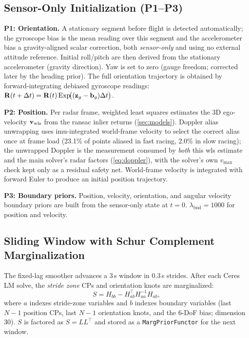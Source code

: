 \subsection{Sensor-Only Initialization (P1--P3)}
\label{sec:init}

\textbf{P1: Orientation.}
A stationary segment before flight is detected automatically; the gyroscope
bias is the mean reading over this segment and the accelerometer bias a
gravity-aligned scalar correction, both \emph{sensor-only} and using no
external attitude reference.
Initial roll/pitch are then derived from the stationary accelerometer
(gravity direction).  Yaw is set to zero (gauge freedom; corrected
later by the heading prior).  The full orientation trajectory is
obtained by forward-integrating debiased gyroscope readings:
$\mathbf{R}(t+\Delta t) = \mathbf{R}(t)\,\mathrm{Exp}\!\bigl((\mathbf{z}_g - \mathbf{b}_g)\Delta t\bigr)$.

\textbf{P2: Position.}
Per radar frame, weighted least squares estimates the 3D ego-velocity
$\mathbf{v}_{\text{wls}}$ from the \ac{ransac} inlier returns
(\autoref{sec:models}).  Doppler alias
unwrapping uses \ac{imu}-integrated world-frame velocity to select the
correct alias once at frame load (23.1\% of points aliased
in fast racing, 2.0\% in slow racing); the unwrapped Doppler is the
measurement consumed by \emph{both} this \ac{wls} estimate and the main
solver's radar factors (\autoref{eq:doppler}), with the solver's own
$v_{\max}$ check kept only as a residual safety net.
World-frame velocity is integrated with forward Euler to produce an
initial position trajectory.

\textbf{P3: Boundary priors.}
Position, velocity, orientation, and angular velocity boundary
priors are built from the sensor-only state at $t=0$.
$\lambda_{\text{bnd}} = 1000$ for position and velocity.

\subsection{Sliding Window with Schur Complement Marginalization}
\label{sec:sw}

The fixed-lag smoother advances a 3\,s window in 0.3\,s strides.
After each Ceres LM solve, the \emph{stride zone} CPs and orientation
knots are marginalized:
\begin{equation}
  S = H_{bb} - H_{ab}^{\top} H_{aa}^{-1} H_{ab},
  \label{eq:schur}
\end{equation}
where $a$ indexes stride-zone variables and $b$ indexes boundary
variables (last $N{-}1$ position CPs, last $N{-}1$ orientation
knots, and the 6-DoF bias; dimension 30).  $S$ is factored as
$S = LL^{\top}$ and stored as a \texttt{MargPriorFunctor} for the
next window.

